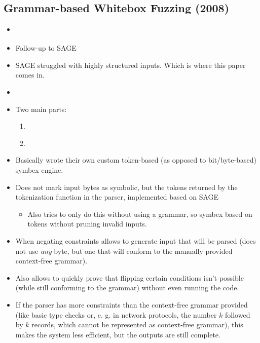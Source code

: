 \documentclass{article}
\begin{document}
\subsection{Grammar-based Whitebox Fuzzing (2008)}
\begin{itemize}
  \item \cite{GWF}
  \item Follow-up to SAGE\cite{SAGE}
  \item SAGE struggled with highly structured inputs. Which is where this paper comes in.
  \item {}\cite{GWF}
  \item Two main parts:
        \begin{enumerate}
          \item {}\cite{GWF}
          \item {}\cite{GWF}
        \end{enumerate}
  \item Basically wrote their own custom token-based (as opposed to bit/byte-based) symbex engine.
  \item Does not mark input bytes as symbolic, but the tokens returned by the tokenization function in the parser, implemented based on SAGE\cite{SAGE}
        \begin{itemize}
          \item Also tries to only do this without using a grammar, so symbex based on tokens without pruning invalid inputs.
        \end{itemize}
  \item When negating constraints allows to generate input that will be parsed (does not use \textit{any} byte, but one that will conform to the manually provided context-free grammar).
  \item Also allows to quickly prove that flipping certain conditions isn't possible (while still conforming to the grammar) without even running the code.
  \item If the parser has more constraints than the context-free grammar provided (like basic type checks or, e. g. in network protocols, the number $k$ followed by $k$ records, which cannot be represented as context-free grammar), this makes the system less efficient, but the outputs are still complete.

\end{itemize}
\end{document}
